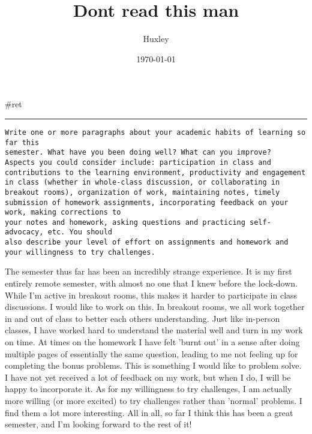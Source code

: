 \documentclass[letterpaper]{article}
\author{Huxley}
\date{\today}
\title{Dont read this man}
\renewcommand{\tableofcontents}{}
\begin{document}
\tableofcontents

\#ret

\noindent\rule{\textwidth}{0.5pt}

\begin{verbatim}
Write one or more paragraphs about your academic habits of learning so far this
semester. What have you been doing well? What can you improve?
Aspects you could consider include: participation in class and contributions to the learning environment, productivity and engagement in class (whether in whole-class discussion, or collaborating in breakout rooms), organization of work, maintaining notes, timely submission of homework assignments, incorporating feedback on your work, making corrections to
your notes and homework, asking questions and practicing self-advocacy, etc. You should
also describe your level of effort on assignments and homework and your willingness to try challenges.
\end{verbatim}

The semester thus far has been an incredibly strange experience. It is
my first entirely remote semester, with almost no one that I knew before
the lock-down. While I'm active in breakout rooms, this makes it harder
to participate in class discussions. I would like to work on this. In
breakout rooms, we all work together in and out of class to better each
others understanding. Just like in-person classes, I have worked hard to
understand the material well and turn in my work on time. At times on
the homework I have felt 'burnt out' in a sense after doing multiple
pages of essentially the same question, leading to me not feeling up for
completing the bonus problems. This is something I would like to problem
solve. I have not yet received a lot of feedback on my work, but when I
do, I will be happy to incorporate it. As for my willingness to try
challenges, I am actually more willing (or more excited) to try
challenges rather than 'normal' problems. I find them a lot more
interesting. All in all, so far I think this has been a great semester,
and I'm looking forward to the rest of it!
\end{document}
